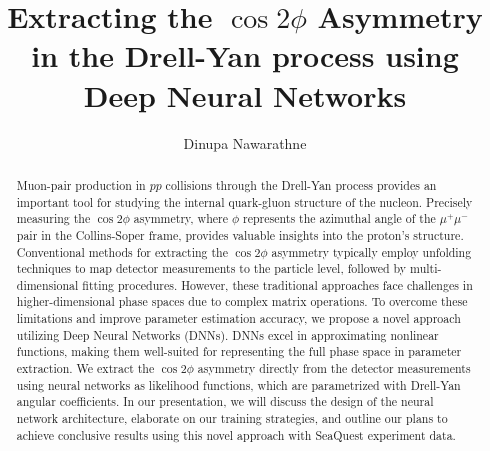 \documentclass{article}
\title{Extracting the $\cos2\phi$ Asymmetry in the Drell-Yan process using Deep Neural Networks}
\author{Dinupa Nawarathne}
\begin{document}
\maketitle

\begin{abstract}
Muon-pair production in $pp$ collisions through the Drell-Yan process provides an important tool for studying the internal quark-gluon
structure of the nucleon. Precisely measuring the $\cos2\phi$ asymmetry, where $\phi$ represents the azimuthal angle of the $\mu^{+}\mu^{-}$
pair in the Collins-Soper frame, provides valuable insights into the proton's structure. Conventional methods for extracting the $\cos2\phi$
asymmetry typically employ unfolding techniques to map detector measurements to the particle level, followed by multi-dimensional
fitting procedures. However, these traditional approaches face challenges in higher-dimensional phase spaces due to complex matrix
operations. To overcome these limitations and improve parameter estimation accuracy, we propose a novel approach utilizing Deep
Neural Networks (DNNs). DNNs excel in approximating nonlinear functions, making them well-suited for representing the full phase
space in parameter extraction. We extract the $\cos2\phi$ asymmetry directly from the detector measurements using neural networks as
likelihood functions, which are parametrized with Drell-Yan angular coefficients. In our presentation, we will discuss the design
of the neural network architecture, elaborate on our training strategies, and outline our plans to achieve conclusive results using
this novel approach with SeaQuest experiment data.
\end{abstract}
\end{document}

